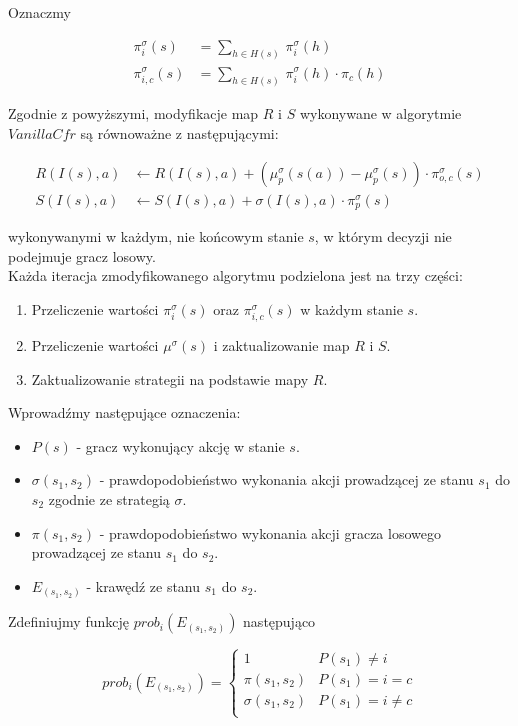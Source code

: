 \documentclass[licencjacka]{pracamgr}
\begin{document}
\noindent
Oznaczmy

\begin{align*}
\pi_i^{\sigma}(s) &= \sum\limits_{h \in H(s)} \, \pi_i^{\sigma}(h) \\
\pi_{i,c}^{\sigma}(s) &= \sum\limits_{h \in H(s)} \, \pi_i^{\sigma}(h) \cdot \pi_c(h)
\end{align*}

\noindent
Zgodnie z powyższymi, modyfikacje map $R$ i $S$ wykonywane w algorytmie $VanillaCfr$ są
równoważne z następującymi:

\begin{align*}
R(I(s), a) &\leftarrow R(I(s), a) + (\mu_p^{\sigma}(s(a)) - \mu_p^{\sigma}(s)) \cdot \pi_{o,c}^{\sigma}(s) \\
S(I(s), a) &\leftarrow S(I(s), a) + \sigma(I(s), a) \cdot \pi_p^{\sigma}(s)
\end{align*}

\noindent
wykonywanymi w każdym, nie końcowym stanie $s$, w którym decyzji nie podejmuje gracz losowy. \\

\noindent
Każda iteracja zmodyfikowanego algorytmu podzielona jest na trzy części:
\begin{enumerate}
\item Przeliczenie wartości $\pi_i^{\sigma}(s)$ oraz $\pi_{i, c}^{\sigma}(s)$ w każdym stanie $s$.
\item Przeliczenie wartości $\mu^{\sigma}(s)$ i zaktualizowanie map $R$ i $S$.
\item Zaktualizowanie strategii na podstawie mapy $R$.
\end{enumerate}

\noindent
Wprowadźmy następujące oznaczenia:

\begin{itemize}
\item $P(s)$ - gracz wykonujący akcję w stanie $s$.
\item $\sigma(s_1, s_2)$ - prawdopodobieństwo wykonania akcji prowadzącej ze stanu $s_1$ do $s_2$ zgodnie ze strategią $\sigma$.
\item $\pi(s_1, s_2)$ - prawdopodobieństwo wykonania akcji gracza losowego prowadzącej ze stanu $s_1$ do $s_2$.
\item $E_{(s_1, s_2)}$ - krawędź ze stanu $s_1$ do $s_2$.
\end{itemize}

\noindent
Zdefiniujmy funkcję $prob_i(E_{(s_1, s_2)})$ następująco 

\begin{equation*}
prob_i(E_{(s_1, s_2)}) = \begin{cases}
                            1                & P(s_1) \neq i     \\
                            \pi(s_1, s_2)    & P(s_1) = i = c    \\
                            \sigma(s_1, s_2) & P(s_1) = i \neq c \\
                          \end{cases}
\end{equation*}
\end{document}
